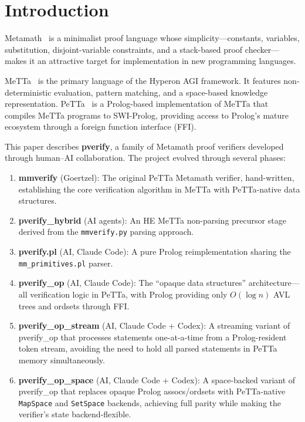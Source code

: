\documentclass[11pt]{article}
\begin{document}
\section{Introduction}
\label{sec:intro}

Metamath~\cite{megill2019} is a minimalist proof language whose
simplicity---constants, variables, substitution, disjoint-variable
constraints, and a stack-based proof checker---makes it an
attractive target for implementation in new programming languages.

MeTTa~\cite{goertzel2023metta} is the primary language of the
Hyperon AGI framework.  It features non-deterministic evaluation,
pattern matching, and a space-based knowledge representation.
PeTTa~\cite{petta} is a Prolog-based implementation of MeTTa
that compiles MeTTa programs to SWI-Prolog, providing access to
Prolog's mature ecosystem through a foreign function interface (FFI).

This paper describes \textbf{pverify}, a family of Metamath proof
verifiers developed through human--AI collaboration.
The project evolved through several phases:

\begin{enumerate}[leftmargin=2em]
  \item \textbf{mmverify} (Goertzel): The original PeTTa Metamath
    verifier, hand-written, establishing the core verification
    algorithm in MeTTa with PeTTa-native data structures.
  \item \textbf{pverify\_hybrid} (AI agents): An HE MeTTa non-parsing
    precursor stage derived from the
    \texttt{mmverify.py} parsing approach.
  \item \textbf{pverify.pl} (AI, Claude Code): A pure Prolog
    reimplementation sharing the \texttt{mm\_primitives.pl} parser.
  \item \textbf{pverify\_op} (AI, Claude Code): The ``opaque data
    structures'' architecture---all verification logic in PeTTa,
    with Prolog providing only $O(\log n)$ AVL trees and ordsets
    through FFI.
  \item \textbf{pverify\_op\_stream} (AI, Claude Code + Codex):
    A streaming variant of pverify\_op that processes statements
    one-at-a-time from a Prolog-resident token stream, avoiding
    the need to hold all parsed statements in PeTTa memory
    simultaneously.
  \item \textbf{pverify\_op\_space} (AI, Claude Code + Codex):
    A space-backed variant of pverify\_op that replaces opaque
    Prolog assocs/ordsets with PeTTa-native \texttt{MapSpace} and
    \texttt{SetSpace} backends, achieving full parity while making
    the verifier's state backend-flexible.
\end{enumerate}
\end{document}
